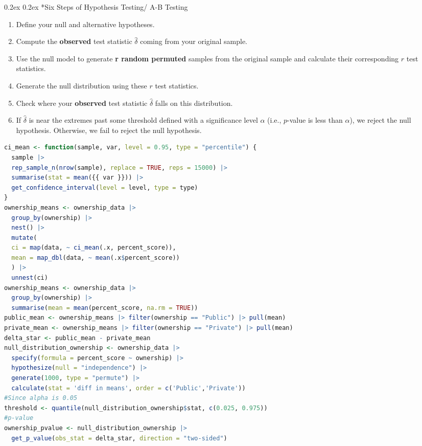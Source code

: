 \documentclass[8pt,landscape]{article}
\makeatletter
\renewcommand{\subsection}{\@startsection{subsection}{2}{0pt}%
    {0.2ex}%
    {0.2ex}%
    {\fontsize{8}{8}\bfseries\color{blue}}} %
\makeatother
\begin{document}
\begin{multicols}{3}
{}
\subsection*{Six Steps of Hypothesis Testing/ A-B Testing}
\begin{enumerate}\fontsize{8}{8}\selectfont
    \item Define your null and alternative hypotheses.
    \item Compute the \textbf{observed} test statistic $\hat{\delta}$ coming from your original sample.
    \item Use the null model to generate \textbf{r random permuted} samples from the original sample and calculate their corresponding $r$ test statistics.
    \item Generate the null distribution using these $r$ test statistics.
    \item Check where your \textbf{observed} test statistic $\hat{\delta}$ falls on this distribution.
    \item If $\hat{\delta}$ is near the extremes past some threshold defined with a significance level $\alpha$ (i.e., $p$-value is less than $\alpha$), we reject the null hypothesis. Otherwise, we fail to reject the null hypothesis.
\end{enumerate}
\begin{lstlisting}[language=R]
ci_mean <- function(sample, var, level = 0.95, type = "percentile") {
  sample |>
  rep_sample_n(nrow(sample), replace = TRUE, reps = 15000) |>
  summarise(stat = mean({{ var }})) |>
  get_confidence_interval(level = level, type = type)
}
ownership_means <- ownership_data |>
  group_by(ownership) |>
  nest() |>
  mutate(
  ci = map(data, ~ ci_mean(.x, percent_score)),
  mean = map_dbl(data, ~ mean(.x$percent_score))
  ) |>
  unnest(ci)
ownership_means <- ownership_data |>
  group_by(ownership) |>
  summarise(mean = mean(percent_score, na.rm = TRUE))
public_mean <- ownership_means |> filter(ownership == "Public") |> pull(mean)
private_mean <- ownership_means |> filter(ownership == "Private") |> pull(mean)
delta_star <- public_mean - private_mean
null_distribution_ownership <- ownership_data |>
  specify(formula = percent_score ~ ownership) |>
  hypothesize(null = "independence") |>
  generate(1000, type = "permute") |>
  calculate(stat = 'diff in means', order = c('Public','Private'))
#Since alpha is 0.05 
threshold <- quantile(null_distribution_ownership$stat, c(0.025, 0.975))
#p-value 
ownership_pvalue <- null_distribution_ownership |>
  get_p_value(obs_stat = delta_star, direction = "two-sided")


\end{lstlisting}
\end{multicols}
\end{document}

